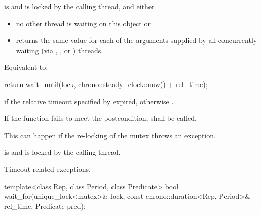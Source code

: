 \begin{itemdescr}
\pnum
\requires {} is  and 
is locked by the calling thread, and either
\begin{itemize}
\item no other thread is waiting on this  object or
\item {} returns the same value for each of the  arguments
supplied by all concurrently waiting (via , , or
) threads.
\end{itemize}

\pnum
\effects Equivalent to:
\begin{codeblock}
return wait_until(lock, chrono::steady_clock::now() + rel_time);
\end{codeblock}

\pnum
\returns {} if
the relative timeout specified by  expired,
otherwise .

\pnum
\remarks
If the function fails to meet the postcondition, 
shall be called.
\begin{note} This can happen if the re-locking of the mutex throws an exception. \end{note}

\pnum
\postconditions {} is  and 
is locked by the calling thread.

\pnum
\throws Timeout-related
exceptions.

\end{itemdescr}

%
\begin{itemdecl}
template<class Rep, class Period, class Predicate>
  bool wait_for(unique_lock<mutex>& lock,
                const chrono::duration<Rep, Period>& rel_time,
                Predicate pred);
\end{itemdecl}

